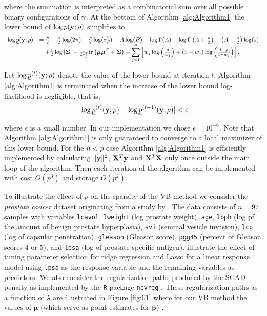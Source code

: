 \documentclass[11pt]{article}
\newtheorem{Main Result}{Main Result}
\def\vectorfontone{\bf}
\def\vectorfonttwo{\boldsymbol}
\def\vy{{\vectorfontone y}}                      %
\def\vbeta{{\vectorfonttwo \beta}}               %
\def\vgamma{{\vectorfonttwo \gamma}}             %
\def\vmu{{\vectorfonttwo \mu}}                   %
\def\matrixfontone{\bf}
\def\matrixfonttwo{\boldsymbol}
\def\mX{{\matrixfontone X}}                      %
\def\mSigma{{\matrixfonttwo \Sigma}}             %
\def\vmuq{{\vmu}}
\def\mSigmaq{{\mSigma}}
\def\Bq{{s}}
\def\ds{\displaystyle}
\begin{document}
\noindent where the summation is interpreted
as a combinatorial sum over all possible binary configurations of $\vgamma$.
At the bottom of Algorithm \ref{alg:Algorithm1} the lower bound of
$\log p(\vy;\rho)$ simplifies to
$$
\begin{array}{rl}
\log \underline{p}(\vy;\rho)
    & \ds = \tfrac{p}{2}
          -  \tfrac{n}{2}\log(2\pi)
          -\tfrac{p}{2}\log(\sigma^2_\beta)
          + A\log(B)
          - \log\Gamma(A) + \log\Gamma\left( A+\tfrac{n}{2} \right)- \left( A+\tfrac{n}{2}  \right)\log(\Bq) \\
    & \ds \quad

+ \tfrac{1}{2}\log|\mSigmaq|
-\tfrac{1}{2\sigma^2_\beta}\mbox{tr}\left(\vmuq\vmuq^T + \mSigmaq \right) + \sum_{j=1}^p \left[
  w_j\log\left( \tfrac{\rho}{w_j} \right)
+ (1 - w_j)\log\left( \tfrac{1-\rho}{1-w_j} \right)
\right].
\end{array}
$$

\noindent Let $\log\underline{p}^{(t)}(\vy;\rho)$ denote the value of the lower
bound at iteration $t$. Algorithm \ref{alg:Algorithm1} is terminated when the increase of the
lower bound log-likelihood is negligible,
that is,
\begin{equation}\label{eq:convergence}
|\log\underline{p}^{(t)}(\vy;\rho)-\log\underline{p}^{(t-1)}(\vy;\rho)|<\epsilon
\end{equation}

\noindent where $\epsilon$ is a small number. In our implementation we
chose $\epsilon = 10^{-6}$. Note that Algorithm \ref{alg:Algorithm1}
is only guaranteed to converge to a local maximizer of this lower bound.
For the $n<p$ case Algorithm \ref{alg:Algorithm1} is efficiently implemented by
calculating $\|\vy\|^2$, $\mX^T\vy$ and $\mX^T\mX$ only once outside the main
loop of the algorithm. Then each iteration of the algorithm can be implemented
with cost $O(p^3)$ and storage $O(p^2)$.
 
 
 To illustrate the effect of $\rho$ on the sparsity of the VB method we consider
the {\it prostate cancer} dataset originating from a study by \cite{Stamey1989}. The data consists of $n=97$ samples with variables {\tt lcavol},
{\tt lweight} (log prostate weight),
{\tt age},
{\tt lbph} (log pf the amount of benign prostate hyperplasia),
{\tt svi} (seminal vesicle invasion),
{\tt lcp} (log of capsular penetration),
{\tt gleason} (Gleason score),
{\tt pgg45} (percent of Gleason scores 4 or 5), and
{\tt lpsa} (log of prostate specific antigen). \cite{Hastie2001} illustrate the
effect of tuning parameter selection for ridge regression and Lasso for a linear
response model using {\tt lpsa} as the response variable and the remaining variables as
predictors. We also consider the regularization paths produced by the SCAD
penalty as implemented by the {\tt R} package {\tt ncvreg}
\citep{Breheny2011}.
These regularization paths as a function of $\lambda$ are illustrated in
Figure \ref{fig:01} where for our VB method the values of $\vmu$ (which
serve as point estimates for $\vbeta$) .
\end{document}
